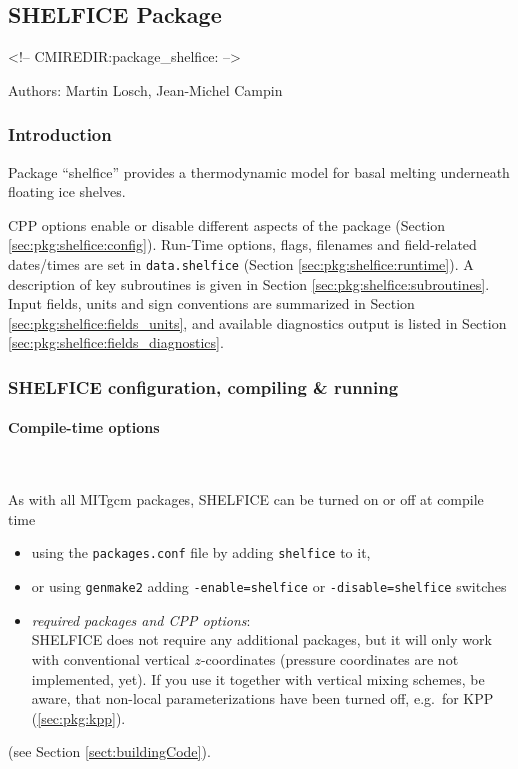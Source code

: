 
\subsection{SHELFICE Package}
\label{sec:pkg:shelfice}
\begin{rawhtml}
<!-- CMIREDIR:package_shelfice: -->
\end{rawhtml}

Authors: Martin Losch, Jean-Michel Campin

\subsubsection{Introduction
\label{sec:pkg:exf:intro}}


Package ``shelfice'' provides a thermodynamic model for basal melting
underneath floating ice shelves.

CPP options enable or disable different aspects of the package
(Section \ref{sec:pkg:shelfice:config}).
Run-Time options, flags, filenames and field-related dates/times are
set in \texttt{data.shelfice}
(Section \ref{sec:pkg:shelfice:runtime}).
A description of key subroutines is given in Section
\ref{sec:pkg:shelfice:subroutines}.
Input fields, units and sign conventions are summarized in
Section \ref{sec:pkg:shelfice:fields_units}, and available diagnostics
output is listed in Section \ref{sec:pkg:shelfice:fields_diagnostics}.


\subsubsection{SHELFICE configuration, compiling \& running}

\paragraph{Compile-time options
\label{sec:pkg:shelfice:config}}
~

As with all MITgcm packages, SHELFICE can be turned on or off at compile time
%
\begin{itemize}
%
\item
using the \texttt{packages.conf} file by adding \texttt{shelfice} to it,
%
\item
or using \texttt{genmake2} adding
\texttt{-enable=shelfice} or \texttt{-disable=shelfice} switches
%
\item
\textit{required packages and CPP options}: \\
SHELFICE does not require any additional packages, but it will only
work with conventional vertical $z$-coordinates (pressure coordinates
are not implemented, yet). If you use it together with vertical mixing
schemes, be aware, that non-local parameterizations have been turned
off, e.g.\ for KPP (\ref{sec:pkg:kpp}).
%
\end{itemize}
(see Section \ref{sect:buildingCode}).

